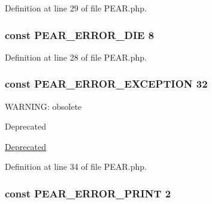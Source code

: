 Definition at line 29 of file P\+E\+A\+R.\+php.

\subsubsection[{\texorpdfstring{P\+E\+A\+R\+\_\+\+E\+R\+R\+O\+R\+\_\+\+D\+IE}{PEAR_ERROR_DIE}}]{\setlength{\rightskip}{0pt plus 5cm}const P\+E\+A\+R\+\_\+\+E\+R\+R\+O\+R\+\_\+\+D\+IE 8}\hypertarget{PEAR_8php_ad34f61c0049eae3d64aca2ad2e6003ab}{}\label{PEAR_8php_ad34f61c0049eae3d64aca2ad2e6003ab}


Definition at line 28 of file P\+E\+A\+R.\+php.

\subsubsection[{\texorpdfstring{P\+E\+A\+R\+\_\+\+E\+R\+R\+O\+R\+\_\+\+E\+X\+C\+E\+P\+T\+I\+ON}{PEAR_ERROR_EXCEPTION}}]{\setlength{\rightskip}{0pt plus 5cm}const P\+E\+A\+R\+\_\+\+E\+R\+R\+O\+R\+\_\+\+E\+X\+C\+E\+P\+T\+I\+ON 32}\hypertarget{PEAR_8php_abef10fde628fe54cde4cf2e86f04e4dc}{}\label{PEAR_8php_abef10fde628fe54cde4cf2e86f04e4dc}
W\+A\+R\+N\+I\+NG\+: obsolete \begin{DoxyRefDesc}{Deprecated}
\item[\hyperlink{deprecated__deprecated000013}{Deprecated}]\end{DoxyRefDesc}


Definition at line 34 of file P\+E\+A\+R.\+php.

\subsubsection[{\texorpdfstring{P\+E\+A\+R\+\_\+\+E\+R\+R\+O\+R\+\_\+\+P\+R\+I\+NT}{PEAR_ERROR_PRINT}}]{\setlength{\rightskip}{0pt plus 5cm}const P\+E\+A\+R\+\_\+\+E\+R\+R\+O\+R\+\_\+\+P\+R\+I\+NT 2}\hypertarget{PEAR_8php_a0e3a03600a1f06a1dbbddd0914b9f794}{}\label{PEAR_8php_a0e3a03600a1f06a1dbbddd0914b9f794}


